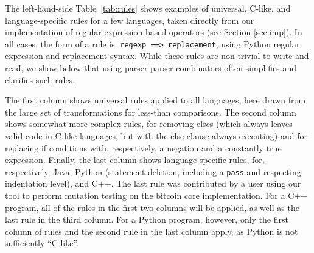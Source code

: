 \documentclass[sigconf,review, anonymous]{acmart}
\begin{document}
{%







  
The left-hand-side Table~\ref{tab:rules} shows examples of universal, C-like, and
language-specific rules for a few languages, taken directly from our
implementation of regular-expression based operators (see Section \ref{sec:imp}).  In all cases, the form of a rule is: {\tt regexp
  ==> replacement}, using Python regular expression and replacement
syntax.  While these rules are non-trivial to write and read, we show
below that using parser parser combinators often simplifies and
clarifies such rules.

The first column shows universal rules applied to
all languages, here drawn from the large set of transformations for
less-than comparisons.  The second column shows somewhat more
complex rules, for removing elses (which always leaves valid code in
C-like languages, but with the else clause always executing) and for
replacing if conditions with, respectively, a negation and a
constantly true expression.  Finally, the last column shows
language-specific rules, for, respectively, Java, Python (statement
deletion, including a {\tt pass} and respecting indentation level),
and C++.  The last rule was contributed by a user using our tool to
perform mutation testing on the bitcoin core implementation.  For a
C++ program, all of the rules in the first two columns will be
applied, as well as the last rule in the third column.  For a Python
program, however, only the first column of rules and the second rule
in the last column apply, as Python is not sufficiently ``C-like''.


}
\end{document}
